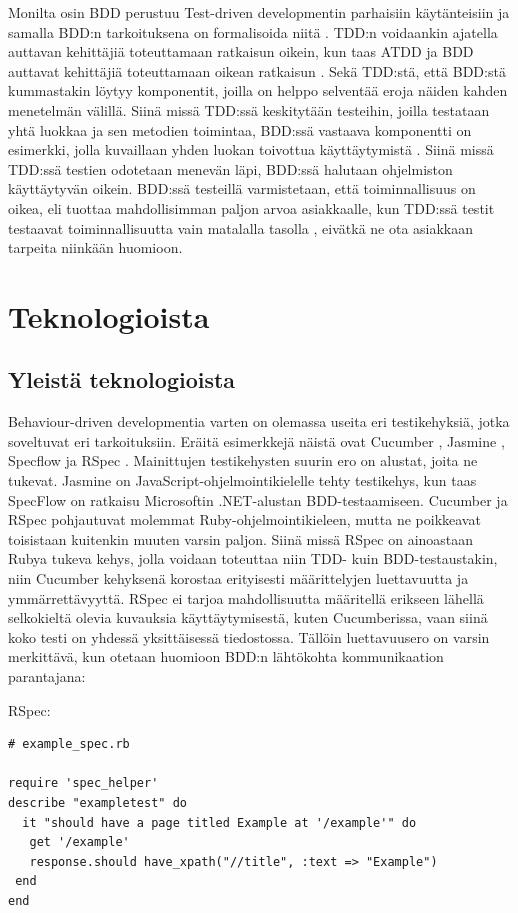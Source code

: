 \documentclass[finnish,nonumbib,nocopyright]{gradu2}
\begin{document}
Monilta osin BDD perustuu Test-driven developmentin parhaisiin käytänteisiin ja samalla BDD:n tarkoituksena on formalisoida niitä \cite{cucumberbook}. TDD:n voidaankin ajatella auttavan kehittäjiä toteuttamaan ratkaisun oikein, kun taas ATDD ja BDD auttavat kehittäjiä toteuttamaan oikean ratkaisun \cite{cucumberbook}. Sekä TDD:stä, että BDD:stä kummastakin löytyy komponentit, joilla on helppo selventää eroja näiden kahden menetelmän välillä. Siinä missä TDD:ssä keskitytään testeihin, joilla testataan yhtä luokkaa ja sen metodien toimintaa, BDD:ssä vastaava komponentti on esimerkki, jolla kuvaillaan yhden luokan toivottua käyttäytymistä \cite{tddbdd}. Siinä missä TDD:ssä testien odotetaan menevän läpi, BDD:ssä halutaan ohjelmiston käyttäytyvän oikein. BDD:ssä testeillä varmistetaan, että toiminnallisuus on oikea, eli tuottaa mahdollisimman paljon arvoa asiakkaalle, kun TDD:ssä testit testaavat toiminnallisuutta vain matalalla tasolla \cite{tddbdd}, eivätkä ne ota asiakkaan tarpeita niinkään huomioon.

\section{Teknologioista}
\subsection{Yleistä teknologioista}
Behaviour-driven developmentia varten on olemassa useita eri testikehyksiä, jotka soveltuvat eri tarkoituksiin. Eräitä esimerkkejä näistä ovat Cucumber \cite{cucumber}, Jasmine \cite{jasmine}, Specflow \cite{specflow} ja RSpec \cite{rspec}. Mainittujen testikehysten suurin ero on alustat, joita ne tukevat. Jasmine on JavaScript-ohjelmointikielelle tehty testikehys, kun taas SpecFlow on ratkaisu Microsoftin .NET-alustan BDD-testaamiseen. Cucumber ja RSpec pohjautuvat molemmat Ruby-ohjelmointikieleen, mutta ne poikkeavat toisistaan kuitenkin muuten varsin paljon. Siinä missä RSpec on ainoastaan Rubya tukeva kehys, jolla voidaan toteuttaa niin TDD- kuin BDD-testaustakin, niin Cucumber kehyksenä korostaa erityisesti määrittelyjen luettavuutta ja ymmärrettävyyttä. RSpec ei tarjoa mahdollisuutta määritellä erikseen lähellä selkokieltä olevia kuvauksia käyttäytymisestä, kuten Cucumberissa, vaan siinä koko testi on yhdessä yksittäisessä tiedostossa. Tällöin luettavuusero on varsin merkittävä, kun otetaan huomioon BDD:n lähtökohta kommunikaation parantajana:

RSpec:
\begin{verbatim}
# example_spec.rb

require 'spec_helper'
describe "exampletest" do
  it "should have a page titled Example at '/example'" do
   get '/example'
   response.should have_xpath("//title", :text => "Example")
 end
end
\end{verbatim} 
\end{document}
